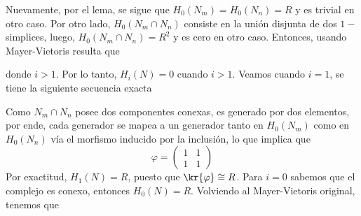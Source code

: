 \documentclass{article}
\begin{document}
\begin{enumerate}
\begin{center}
    \end{center}
    Nuevamente, por el lema, se sigue que $H_{0}(N_{m})=H_{0}(N_{n})=R$ y es trivial en otro caso.
    Por otro lado, $H_{0}(N_{m}\cap N_{n})$ consiste en la unión disjunta de dos $1-$simplices,
    luego, $H_{0}(N_{m}\cap N_{n})=R^{2}$ y es cero en otro caso. Entonces, usando Mayer-Vietoris
    resulta que

    \vspace{2mm}
    \centerline{
    }
    \vspace{1mm}
    donde $i>1$. Por lo tanto, $H_{i}(N)=0$ cuando $i>1$. Veamos cuando $i=1$, se tiene la 
    siguiente secuencia exacta

    \vspace{2mm}
    \centerline{
    }
    \vspace{1mm}
    Como $N_{m}\cap N_{n}$ posee dos componentes conexas, es generado por dos elementos, por ende,
    cada generador se mapea a un generador tanto en $H_{0}(N_{m})$ como en $H_{0}(N_{n})$ vía el
    morfismo inducido por la inclusión, lo que implica que
    \begin{equation*}
        \varphi=\begin{pmatrix}
            1 & 1 \\ 1 & 1
        \end{pmatrix}
    \end{equation*}
    Por exactitud, $H_{1}(N)=R$, puesto que $\kr{\varphi}\cong R$. Para $i=0$ sabemos que el 
    complejo es conexo, entonces $H_{0}(N)= R$. Volviendo al Mayer-Vietoris original, tenemos que


\end{enumerate}
\end{document}
